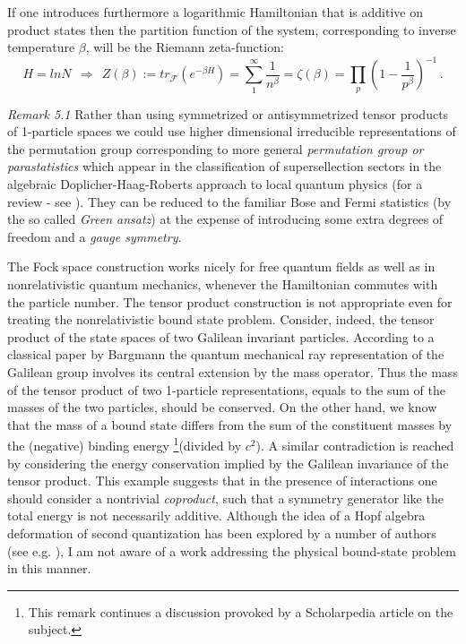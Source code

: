 If one introduces furthermore a logarithmic Hamiltonian that is additive on 
product states then the partition function of the system, corresponding to 
inverse temperature $\beta$, will be the Riemann zeta-function:
\begin{equation}
\label{HZ}
H = ln N \ \ \Rightarrow \ \ Z(\beta):= tr_{\mathcal F}(e^{-\beta H}) = \sum_1^\infty \frac{1}{n^\beta} =\zeta(\beta)=
\prod_p(1-\frac{1}{p^\beta})^{-1}\,.
\end{equation}

{\it Remark 5.1} Rather than using symmetrized or antisymmetrized tensor products of 1-particle spaces we could use higher
dimensional irreducible representations of the permutation group corresponding to more general {\it permutation group or
parastatistics} which appear in the classification of supersellection sectors in the algebraic Doplicher-Haag-Roberts
approach to local quantum physics (for a review - see \cite{H}). They can be reduced to the familiar Bose and Fermi
statistics (by the so called {\it Green ansatz}) at the expense of introducing some extra degrees of freedom and a
{\it gauge symmetry}.

The Fock space construction works nicely for free quantum fields as well as in nonrelativistic quantum mechanics, whenever the Hamiltonian commutes with the particle number. The tensor product construction is not appropriate even for treating the nonrelativistic bound state problem. Consider, indeed, the tensor product of the state spaces of two Galilean invariant particles. According to a classical paper by Bargmann \cite{B54} the quantum mechanical ray representation of the Galilean group involves its central extension by the mass operator. Thus the mass of the tensor product of two 1-particle representations, equals to the sum of the masses of the two particles, should be conserved. On the other hand, we know that the mass of a bound state differs from the sum of the constituent masses by the (negative) binding energy \footnote{This remark continues a discussion provoked by a Scholarpedia article on the subject.}(divided by $c^2$). A similar contradiction is reached by considering the energy conservation implied by the Galilean invariance of the tensor product. This example suggests that in the presence of interactions one should consider a nontrivial {\it coproduct}, such that a symmetry generator like the total energy is not necessarily additive. Although the idea of a Hopf algebra deformation of second quantization has been explored by a number of authors (see e.g. \cite{CCT}), I am not aware of a work addressing the physical bound-state problem in this manner.

